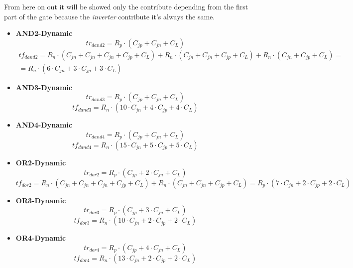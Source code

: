 \documentclass[12pt,  english, makeidx, a4paper, titlepage, oneside]{article}
\begin{document}
From here on out it will be showed only the contribute depending from the first part of the gate because the \textit{inverter} contribute it's always the same.
\begin{itemize}
	\item\textbf{AND2-Dynamic}
	\begin{equation}
	tr_{dand2}= R_p \cdot ( C_{jp} + C_{jn} +  C_L )
	\end{equation}
	\begin{equation}
	\begin{gathered}
	tf_{dand2}= R_n \cdot (  C_{jn} + C_{jn} +C_{jn} + C_{jp} + C_L ) +R_n \cdot (  C_{jn} + C_{jn} + C_{jp} + C_L ) +  R_n \cdot (  C_{jn}  + C_{jp} +C_L ) =\\=  R_n \cdot ( 6\cdot C_{jn} + 3 \cdot C_{jp} + 3\cdot C_L )
	\end{gathered}
	\end{equation}
	\item\textbf{AND3-Dynamic}
	\begin{equation}
	tr_{dand3}= R_p \cdot ( C_{jp} + C_{jn} +  C_L )
	\end{equation}
	\begin{equation}
	tf_{dand3}=   R_n \cdot ( 10\cdot C_{jn} + 4 \cdot C_{jp} + 4\cdot C_L )
	\end{equation}
	\item\textbf{AND4-Dynamic}
	\begin{equation}
	tr_{dand4}= R_p \cdot ( C_{jp} + C_{jn} +  C_L )
	\end{equation}
	\begin{equation}
	tf_{dand4}=   R_n \cdot ( 15\cdot C_{jn} + 5 \cdot C_{jp} + 5\cdot C_L )
	\end{equation}
	\item\textbf{OR2-Dynamic}
	\begin{equation}
	tr_{dor2}= R_p \cdot ( C_{jp} + 2 \cdot C_{jn} +   C_L )
	\end{equation}
	\begin{equation}
	tf_{dor2}= R_n \cdot ( C_{jn} + C_{jn} + C_{jn}+ C_{jp} + C_L )+ R_n \cdot ( C_{jn} + C_{jn} + C_{jp} + C_L ) = R_p\cdot (7\cdot C_{jn} + 2\cdot C_{jp} + 2\cdot C_L )
	\end{equation}
	\item\textbf{OR3-Dynamic}
	\begin{equation}
	tr_{dor3}= R_p \cdot (  C_{jp} + 3 \cdot C_{jn} +  C_L )
	\end{equation}
	\begin{equation}
	tf_{dor3}= R_n \cdot(10\cdot C_{jn} + 2\cdot C_{jp} + 2\cdot C_L )
	\end{equation}
	\item\textbf{OR4-Dynamic}
	\begin{equation}
	tr_{dor4}= R_p \cdot (  C_{jp} + 4 \cdot C_{jn} +  C_L )
	\end{equation}
	\begin{equation}
	tf_{dor4}= R_n \cdot(13\cdot C_{jn} +2\cdot C_{jp} +2\cdot C_L )
	\end{equation}
\end{itemize}
\end{document}
